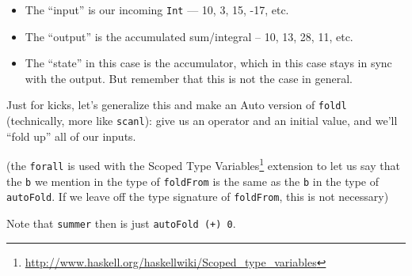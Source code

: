 \documentclass[]{article}
\newenvironment{Shaded}{}{}
\newcommand{\CommentTok}[1]{\textcolor[rgb]{0.38,0.63,0.69}{\textit{#1}}}
\newcommand{\DataTypeTok}[1]{\textcolor[rgb]{0.56,0.13,0.00}{#1}}
\newcommand{\FunctionTok}[1]{\textcolor[rgb]{0.02,0.16,0.49}{#1}}
\newcommand{\KeywordTok}[1]{\textcolor[rgb]{0.00,0.44,0.13}{\textbf{#1}}}
\newcommand{\NormalTok}[1]{#1}
\newcommand{\OperatorTok}[1]{\textcolor[rgb]{0.40,0.40,0.40}{#1}}
\newcommand{\OtherTok}[1]{\textcolor[rgb]{0.00,0.44,0.13}{#1}}
\renewcommand{\href}[2]{#2\footnote{\url{#1}}}
\begin{document}
\begin{itemize}
\tightlist
\item
  The ``input'' is our incoming \texttt{Int} --- 10, 3, 15, -17, etc.
\item
  The ``output'' is the accumulated sum/integral -- 10, 13, 28, 11, etc.
\item
  The ``state'' in this case is the accumulator, which in this case stays in
  sync with the output. But remember that this is not the case in general.
\end{itemize}

Just for kicks, let's generalize this and make an Auto version of \texttt{foldl}
(technically, more like \texttt{scanl}): give us an operator and an initial
value, and we'll ``fold up'' all of our inputs.

\begin{Shaded}
\end{Shaded}

(the \texttt{forall} is used with the
\href{http://www.haskell.org/haskellwiki/Scoped_type_variables}{Scoped Type
Variables} extension to let us say that the \texttt{b} we mention in the type of
\texttt{foldFrom} is the same as the \texttt{b} in the type of
\texttt{autoFold}. If we leave off the type signature of \texttt{foldFrom}, this
is not necessary)

Note that \texttt{summer} then is just \texttt{autoFold\ (+)\ 0}.
\end{document}
